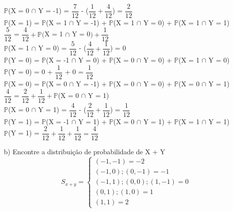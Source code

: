 \documentclass[12pt,a4paper,draft,final,oneside]{article}
\begin{document}
\begin{center}
	\vspace{0.25cm}\\
	$\mathbb{P}$(X = 0 $\cap$ Y = -1) = $\dfrac{7}{12}$ - ($\dfrac{1}{12} + \dfrac{4}{12}$) = $\dfrac{2}{12}$
	\vspace{1cm}\\
	$\mathbb{P}$(X = 1) = $\mathbb{P}$(X = 1 $\cap$ Y = -1) + $\mathbb{P}$(X = 1 $\cap$ Y = 0) + $\mathbb{P}$(X = 1 $\cap$ Y = 1)
	\vspace{0.25cm}\\
	$\dfrac{5}{12}$ = $\dfrac{4}{12} + \mathbb{P}($X = 1 $\cap$ Y = 0$) + \dfrac{1}{12}$
	\vspace{0.25cm}\\
	$\mathbb{P}$(X = 1 $\cap$ Y = 0) = $\dfrac{5}{12}$ - ($\dfrac{4}{12} + \dfrac{1}{12}$) = 0
	\vspace{1cm}\\
	$\mathbb{P}$(Y = 0) = $\mathbb{P}$(X = -1 $\cap$ Y = 0) + $\mathbb{P}$(X = 0 $\cap$ Y = 0) + $\mathbb{P}$(X = 1 $\cap$ Y = 0)
	\vspace{0.25cm}\\
	$\mathbb{P}$(Y = 0) = 0 + $\dfrac{1}{12}$ + 0 = $\dfrac{1}{12}$
	\vspace{1cm}\\
	$\mathbb{P}$(X = 0) = $\mathbb{P}$(X = 0 $\cap$ Y = -1) + $\mathbb{P}$(X = 0 $\cap$ Y = 0) + $\mathbb{P}$(X = 0 $\cap$ Y = 1)
	\vspace{0.25cm}\\
	$\dfrac{4}{12}$ = $\dfrac{2}{12} + \dfrac{1}{12} + \mathbb{P}$(X = 0 $\cap$ Y = 1)
	\vspace{0.25cm}\\
	$\mathbb{P}$(X = 0 $\cap$ Y = 1) = $\dfrac{4}{12}$ - ($\dfrac{2}{12} + \dfrac{1}{12}$) = $\dfrac{1}{12}$
	\vspace{1cm}\\
	$\mathbb{P}$(Y = 1) = $\mathbb{P}$(X = -1 $\cap$ Y = 1) + $\mathbb{P}$(X = 0 $\cap$ Y = 1) + $\mathbb{P}$(X = 1 $\cap$ Y = 1)
	\vspace{0.25cm}\\
	$\mathbb{P}$(Y = 1) = $\dfrac{2}{12} + \dfrac{1}{12} + \dfrac{1}{12} = \dfrac{4}{12}$
	\end{center}
	\vspace{1cm}
	b) Encontre a distribuição de probabilidade de X + Y
		\vspace{0.5cm}
	\[
	S_{x+y} =
	\begin{cases}
	(-1, -1) = -2 \\
	(-1, 0); (0, -1) = -1\\
	(-1, 1); (0, 0); (1, -1) = 0\\
	(0, 1); (1, 0) = 1\\
	(1,1) = 2
	\end{cases}
	\]
\end{document}
